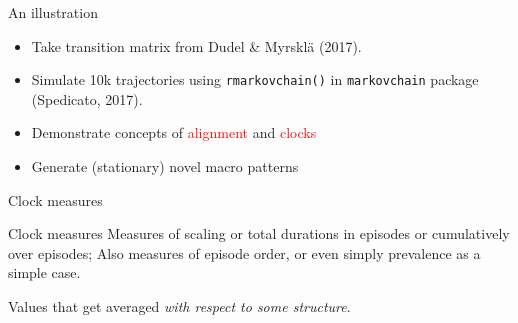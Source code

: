 \documentclass[20pt,usenames,dvipsnames]{beamer}
\begin{document}
\begin{frame}[plain]
\Large
\begin{center}
An illustration
\pause
\begin{itemize}[<+->]
  \item Take transition matrix from \normalsize{Dudel \& Myrskl\"a (2017)}.
  \item Simulate 10k trajectories using \texttt{rmarkovchain()} in \texttt{markovchain}
  package \normalsize{(Spedicato, 2017)}.
  \item Demonstrate concepts of \textcolor{red}{alignment} and \textcolor{red}{clocks}
  \item Generate (stationary) novel macro patterns
\end{itemize}
\end{center}
\end{frame}

\begin{frame}[plain]
\Large
\begin{center}
Clock measures
\vspace{1em}
\begin{overlayarea}{\textwidth}{.4\textheight}
\end{overlayarea}
\end{center}
\end{frame}

\begin{frame}[plain]
\Large
\begin{center}
\begin{block}{Clock measures}
Measures of scaling or total durations in episodes or cumulatively over episodes; Also
measures of episode order, or even simply prevalence as a simple case.
\end{block}
\pause
Values that get averaged \emph{with respect to some structure}.
\end{center}
\end{frame}
\end{document}
